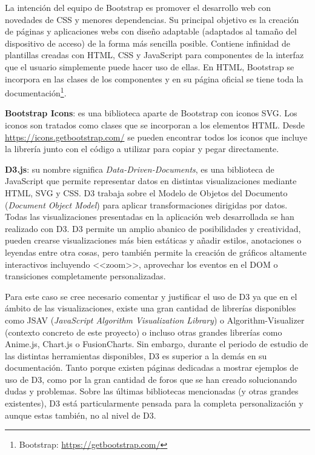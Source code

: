 La intención del equipo de Bootstrap es promover el desarrollo web con novedades
de CSS y menores dependencias. Su principal objetivo es la creación de páginas y
aplicaciones webs con diseño adaptable (adaptados al tamaño del dispositivo de
acceso) de la forma más sencilla posible. Contiene infinidad de plantillas
creadas con HTML, CSS y JavaScript para componentes de la interfaz que el
usuario simplemente puede hacer uso de ellas. En HTML, Bootstrap se incorpora en
las clases de los componentes y en su página oficial se tiene toda la
documentación\footnote{Bootstrap: \url{https://getbootstrap.com/}}.

\textbf{Bootstrap Icons}: es una biblioteca aparte de Bootstrap con iconos SVG.
Los iconos son tratados como clases que se incorporan a los elementos HTML.
Desde \url{https://icons.getbootstrap.com/} se pueden encontrar todos los iconos
que incluye la librería junto con el código a utilizar para copiar y pegar
directamente.

\textbf{D3.js}: su nombre significa \textit{Data-Driven-Documents}, es una
biblioteca de JavaScript que permite representar datos en distintas
visualizaciones mediante HTML, SVG y CSS. D3 trabaja sobre el Modelo de Objetos
del Documento (\emph{Document Object Model}) para aplicar transformaciones
dirigidas por datos. Todas las visualizaciones presentadas en la aplicación web
desarrollada se han realizado con D3. D3 permite un amplio abanico de
posibilidades y creatividad, pueden crearse visualizaciones más bien estáticas y
añadir estilos, anotaciones o leyendas entre otra cosas, pero también permite la
creación de gráficos altamente interactivos incluyendo <<zoom>>, aprovechar los
eventos en el DOM o transiciones completamente personalizadas.

Para este caso se cree necesario comentar y justificar el uso de D3 ya que en el
ámbito de las visualizaciones, existe una gran cantidad de librerías disponibles
como JSAV (\emph{JavaScript Algorithm Visualization Library}) o
Algorithm-Visualizer (contexto concreto de este proyecto) o incluso otras
grandes librerías como Anime.js, Chart.js o FusionCharts. Sin embargo, durante
el periodo de estudio de las distintas herramientas disponibles, D3 es superior
a la demás en su documentación. Tanto porque existen páginas dedicadas a mostrar
ejemplos de uso de D3, como por la gran cantidad de foros que se han creado
solucionando dudas y problemas. Sobre las últimas bibliotecas mencionadas (y
otras grandes existentes), D3 está particularmente pensada para la completa
personalización y aunque estas también, no al nivel de D3.


